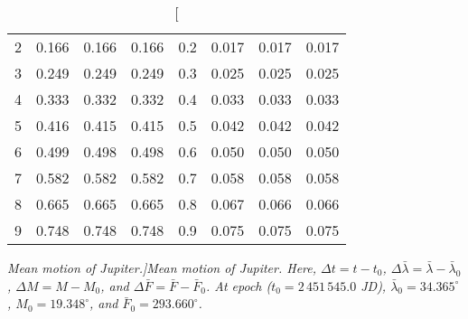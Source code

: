 \begin{table}
\begin{tabular}{rrrr|rrrr}
2 &   0.166 &   0.166 &   0.166 & 0.2 &   0.017 &   0.017 &   0.017\\
3 &   0.249 &   0.249 &   0.249 & 0.3 &   0.025 &   0.025 &   0.025\\
4 &   0.333 &   0.332 &   0.332 & 0.4 &   0.033 &   0.033 &   0.033\\
5 &   0.416 &   0.415 &   0.415 & 0.5 &   0.042 &   0.042 &   0.042\\
6 &   0.499 &   0.498 &   0.498 & 0.6 &   0.050 &   0.050 &   0.050\\
7 &   0.582 &   0.582 &   0.582 & 0.7 &   0.058 &   0.058 &   0.058\\
8 &   0.665 &   0.665 &   0.665 & 0.8 &   0.067 &   0.066 &   0.066\\
9 &   0.748 &   0.748 &   0.748 & 0.9 &   0.075 &   0.075 &   0.075\\
\end{tabular}
\caption[\em Mean motion of Jupiter.]{\em Mean motion of Jupiter.  Here, $\Delta t = t-t_0$, $\Delta\bar{\lambda} = \bar{\lambda}-\bar{\lambda}_0$, $\Delta M = M - M_0$, and $\Delta\bar{F} = \bar{F} - \bar{F}_0$. At epoch  ($t_0 = 2\,451\,545.0$ JD), $\bar{\lambda}_0 = 34.365^\circ$,  $M_0 = 19.348^\circ$, and $\bar{F}_0=293.660^\circ$. }\label{vt11}
\end{table}

